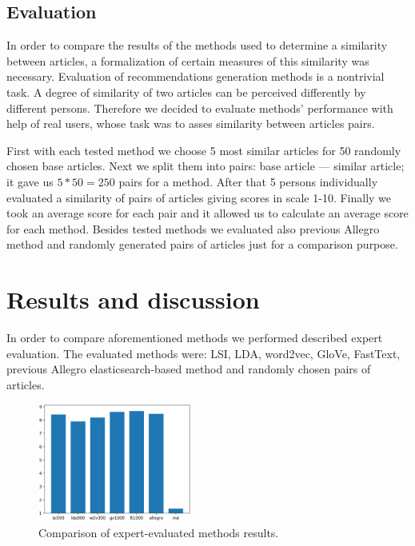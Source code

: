\documentclass[twoside,twocolumn]{article}
\begin{document}
	
	
	\subsection{Evaluation}
	
	In order to compare the results of the methods used to determine a similarity between articles, a formalization of certain measures of this similarity was necessary. Evaluation of recommendations generation methods is a nontrivial task. A degree of similarity of two articles can be perceived differently by different persons. Therefore we decided to evaluate methods' performance with help of real users, whose task was to asses similarity between articles pairs.
	
	First with each tested method we choose 5 most similar articles for 50 randomly chosen base articles. Next we split them into pairs: base article --- similar article; it gave us $5*50=250$ pairs for a method. After that 5 persons individually evaluated a similarity of pairs of articles giving scores in scale 1-10. Finally we took an average score for each pair and it allowed us to calculate an average score for each method. Besides tested methods we evaluated also previous Allegro method and randomly generated pairs of articles just for a comparison purpose.
	
	
	
	\section{Results and discussion}
	In order to compare aforementioned methods we performed described expert evaluation. The evaluated methods were: LSI, LDA, word2vec, GloVe, FastText, previous Allegro elasticsearch-based method and randomly chosen pairs of articles.


	\begin{figure}
		\centering
		\includegraphics[width=0.45\textwidth]{results.png}
		\caption{Comparison of expert-evaluated methods results.}
	\end{figure}
	
\end{document}
